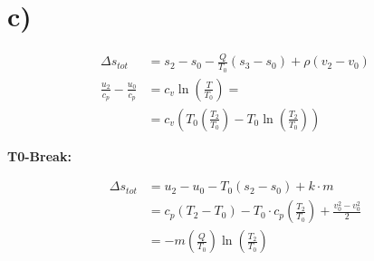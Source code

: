 

\section*{c)}

\begin{align*}
\Delta s_{tot} &= s_2 - s_0 - \frac{Q}{T_0}(s_3 - s_0) + \rho(v_2 - v_0) \\
\frac{u_2}{c_p} - \frac{u_0}{c_p} &= c_v \ln \left( \frac{T}{T_0} \right) = \\
&= c_v \left( T_0 \left( \frac{T_2}{T_0} \right) - T_0 \ln \left( \frac{T_2}{T_0} \right) \right)
\end{align*}

\textbf{T0-Break:}

\begin{align*}
\Delta s_{tot} &= u_2 - u_0 - T_0(s_2 - s_0) + k \cdot m \\
&= c_p \left( T_2 - T_0 \right) - T_0 \cdot c_p \left( \frac{T_2}{T_0} \right) + \frac{v_0^2 - v_0^2}{2} \\
&= -m \left( \frac{Q}{T_0} \right) \ln \left( \frac{T_2}{T_0} \right)
\end{align*}